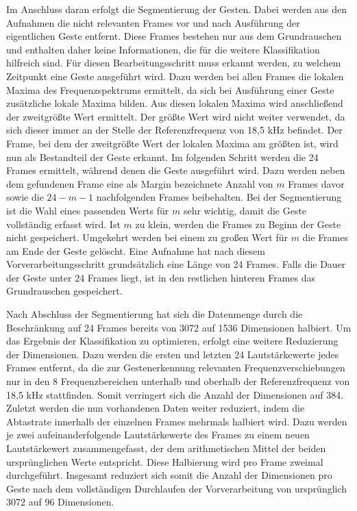 Im Anschluss daran erfolgt die Segmentierung der Gesten. Dabei werden aus den Aufnahmen die nicht relevanten Frames vor und nach Ausführung der eigentlichen Geste entfernt. Diese Frames bestehen nur aus dem Grundrauschen und enthalten daher keine Informationen, die für die weitere Klassifikation hilfreich sind.
Für diesen Bearbeitungsschritt muss erkannt werden, zu welchem Zeitpunkt eine Geste ausgeführt wird. Dazu werden bei allen Frames die lokalen Maxima des Frequenzspektrums ermittelt, da sich bei Ausführung einer Geste zusätzliche lokale Maxima bilden.
Aus diesen lokalen Maxima wird anschließend der zweitgrößte Wert ermittelt. Der größte Wert wird nicht weiter verwendet, da sich dieser immer an der Stelle der Referenzfrequenz von 18,5 kHz befindet. 
Der Frame, bei dem der zweitgrößte Wert der lokalen Maxima am größten ist, wird nun als Bestandteil der Geste erkannt. 
Im folgenden Schritt werden die 24 Frames ermittelt, während denen die Geste ausgeführt wird. 
Dazu werden neben dem gefundenen Frame eine als Margin bezeichnete Anzahl von $m$ Frames davor sowie die $24-m-1$ nachfolgenden Frames beibehalten. Bei der Segmentierung ist die Wahl eines passenden Werts für $m$ sehr wichtig, damit die Geste vollständig erfasst wird. Ist $m$ zu klein, werden die Frames zu Beginn der Geste nicht gespeichert. Umgekehrt werden bei einem zu großen Wert für $m$ die Frames am Ende der Geste gelöscht. Eine Aufnahme hat nach diesem Vorverarbeitungsschritt grundsätzlich eine Länge von 24 Frames. Falls die Dauer der Geste unter 24 Frames liegt, ist in den restlichen hinteren Frames das Grundrauschen gespeichert.

Nach Abschluss der Segmentierung hat sich die Datenmenge durch die Beschränkung auf 24 Frames bereits von 3072 auf 1536 Dimensionen halbiert. Um das Ergebnis der Klassifikation zu optimieren, erfolgt eine weitere Reduzierung der Dimensionen. Dazu werden die ersten und letzten 24 Lautstärkewerte jedes Frames entfernt, da die zur Gestenerkennung relevanten Frequenzverschiebungen nur in den 8 Frequenzbereichen unterhalb und oberhalb der Referenzfrequenz von 18,5 kHz stattfinden. Somit verringert sich die Anzahl der Dimensionen auf 384. Zuletzt werden die nun vorhandenen Daten weiter reduziert, indem die Abtastrate innerhalb der einzelnen Frames mehrmals halbiert wird. Dazu werden je zwei aufeinanderfolgende Lautstärkewerte des Frames zu einem neuen Lautstärkewert zusammengefasst, der dem arithmetischen Mittel der beiden ursprünglichen Werte entspricht. Diese Halbierung wird pro Frame zweimal durchgeführt.
Insgesamt reduziert sich somit die Anzahl der Dimensionen pro Geste nach dem vollständigen Durchlaufen der Vorverarbeitung von ursprünglich 3072 auf 96 Dimensionen. 


